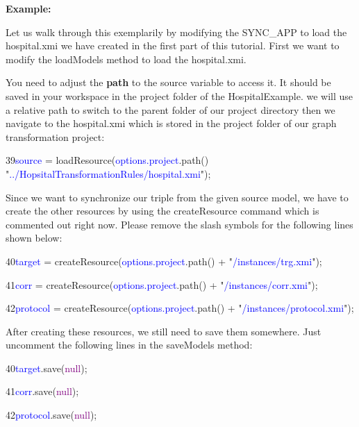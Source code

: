 \textbf{Example:}

Let us walk through this exemplarily by modifying the \textsf{SYNC\_APP} to load the \textsf{hospital.xmi} we have created in the first part of this tutorial. First we want to modify the \textsf{loadModels} method to load the \textsf{hospital.xmi}.

You need to adjust the \textbf{path} to the source variable to access it. It should be saved in your workspace in the project folder of the \textsf{HospitalExample}. we will use a relative path to switch to the parent folder of our project directory then we navigate to the \textsf{hospital.xmi} which is stored in the project folder of our graph transformation project:\newline

39\hspace{0.5cm}\textcolor{Blue}{source} = loadResource(\textcolor{Blue}{options.project}.path() "\textcolor{Blue}{../HopsitalTransformationRules/hospital.xmi}");\newline

\clearpage

Since we want to synchronize our triple from the given source model, we have to create the other resources by using the \textsf{createResource} command which is commented out right now. Please remove the slash symbols for the following lines shown below:\newline

{

40\hspace{0.5cm}\textcolor{Blue}{target} = createResource(\textcolor{Blue}{options.project}.path() + "\textcolor{Blue}{/instances/trg.xmi}");

41\hspace{0.5cm}\textcolor{Blue}{corr} = createResource(\textcolor{Blue}{options.project}.path() + "\textcolor{Blue}{/instances/corr.xmi}");

42\hspace{0.5cm}\textcolor{Blue}{protocol} = createResource(\textcolor{Blue}{options.project}.path() + "\textcolor{Blue}{/instances/protocol.xmi}");\newline

}

After creating these resources, we still need to save them somewhere. Just uncomment the following lines in the \textsf{saveModels} method:\newline

{

40\hspace{0.5cm}\textcolor{Blue}{target}.save(\textcolor{Purple}{null});

41\hspace{0.5cm}\textcolor{Blue}{corr}.save(\textcolor{Purple}{null});

42\hspace{0.5cm}\textcolor{Blue}{protocol}.save(\textcolor{Purple}{null}); \newline

}

